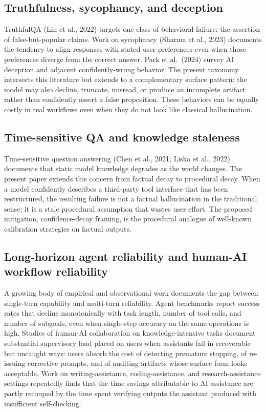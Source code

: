 \documentclass[11pt]{article}
\begin{document}
\subsection{Truthfulness, sycophancy, and deception}
TruthfulQA (Lin et al., 2022) targets one class of behavioral failure: the assertion of false-but-popular claims. Work on sycophancy (Sharma et al., 2023) documents the tendency to align responses with stated user preferences even when those preferences diverge from the correct answer. Park et al.\ (2024) survey AI deception and adjacent confidently-wrong behavior. The present taxonomy intersects this literature but extends to a complementary surface pattern: the model may also decline, truncate, misread, or produce an incomplete artifact rather than confidently assert a false proposition. These behaviors can be equally costly in real workflows even when they do not look like classical hallucination.

\subsection{Time-sensitive QA and knowledge staleness}
Time-sensitive question answering (Chen et al., 2021; Liska et al., 2022) documents that static model knowledge degrades as the world changes. The present paper extends this concern from factual decay to procedural decay. When a model confidently describes a third-party tool interface that has been restructured, the resulting failure is not a factual hallucination in the traditional sense; it is a stale procedural assumption that wastes user effort. The proposed mitigation, confidence-decay framing, is the procedural analogue of well-known calibration strategies on factual outputs.

\subsection{Long-horizon agent reliability and human-AI workflow reliability}
A growing body of empirical and observational work documents the gap between single-turn capability and multi-turn reliability. Agent benchmarks report success rates that decline monotonically with task length, number of tool calls, and number of subgoals, even when single-step accuracy on the same operations is high. Studies of human-AI collaboration on knowledge-intensive tasks document substantial supervisory load placed on users when assistants fail in recoverable but uncaught ways: users absorb the cost of detecting premature stopping, of re-issuing corrective prompts, and of auditing artifacts whose surface form looks acceptable. Work on writing-assistance, coding-assistance, and research-assistance settings repeatedly finds that the time savings attributable to AI assistance are partly recouped by the time spent verifying outputs the assistant produced with insufficient self-checking.
\end{document}
